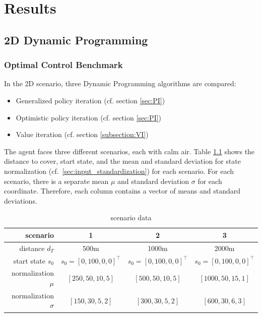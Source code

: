 \chapter{Results}
\label{chapter6}

\section{2D Dynamic Programming}

\subsection{Optimal Control Benchmark}
\label{sec:results_dp}
In the 2D scenario, three Dynamic Programming algorithms are compared:

\begin{itemize}
	\item Generalized policy iteration (cf. section \ref{sec:PI})
	\item Optimistic policy iteration (cf. section \ref{sec:PI})
	\item Value iteration (cf. section \ref{subsection:VI})
\end{itemize}

The agent faces three different scenarios, each with calm air. Table \ref{tab:scenario_data} shows the distance to cover, start state, and the mean and standard deviation for state normalization (cf.~\ref{sec:input_standardization}) for each scenario. For each scenario, there is a separate mean $\mu$ and standard deviation $\sigma$ for each coordinate. Therefore, each column contains a vector of means and standard deviations.

\begin{table}[h]
	\begin{center}
		\begin{tabular}{r|c c c}
			scenario & 1 & 2 & 3 \\ \hline
			distance $d_T$ & 500m & 1000m & 2000m\\
			start state $s_0$ & $s_0 = [0, 100, 0, 0]^\top$ &  $s_0 = [0, 100, 0, 0]^\top$  &  $s_0 = [0, 100, 0, 0]^\top$  \\
			normalization $\mu$ & $[250, 50, 10, 5]$  & $[500, 50, 10, 5]$ & $[1000, 50, 15, 1]$ \\
			normalization $\sigma$ & $[150, 30, 5, 2]$ & $[300, 30, 5, 2]$ & $[600, 30, 6, 3]$
		\end{tabular}
		\caption{scenario data}
		\label{tab:scenario_data}
	\end{center}
\end{table}

